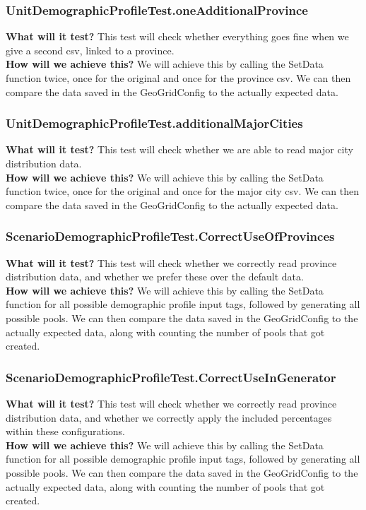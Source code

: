 \documentclass{article}
\begin{document}
\newpage

\subsubsection{UnitDemographicProfileTest.oneAdditionalProvince}
\textbf{What will it test?} 
This test will check whether everything goes fine when we give a second csv, linked to a province. \\
\newline
\textbf{How will we achieve this?}
We will achieve this by calling the SetData function twice, once for the original and once for the province csv. We can then compare the data saved in the GeoGridConfig to the actually expected data.

\subsubsection{UnitDemographicProfileTest.additionalMajorCities}
\textbf{What will it test?} 
This test will check whether we are able to read major city distribution data. \\
\newline
\textbf{How will we achieve this?}
We will achieve this by calling the SetData function twice, once for the original and once for the major city csv. We can then compare the data saved in the GeoGridConfig to the actually expected data.

\subsubsection{ScenarioDemographicProfileTest.CorrectUseOfProvinces}
\textbf{What will it test?} 
This test will check whether we correctly read province distribution data, and whether we prefer these over the default data. \\
\newline
\textbf{How will we achieve this?}
We will achieve this by calling the SetData function for all possible demographic profile input tags, followed by generating all possible pools. We can then compare the data saved in the GeoGridConfig to the actually expected data, along with counting the number of pools that got created.

\subsubsection{ScenarioDemographicProfileTest.CorrectUseInGenerator}
\textbf{What will it test?} 
This test will check whether we correctly read province distribution data, and whether we correctly apply the included percentages within these configurations. \\
\newline
\textbf{How will we achieve this?}
We will achieve this by calling the SetData function for all possible demographic profile input tags, followed by generating all possible pools. We can then compare the data saved in the GeoGridConfig to the actually expected data, along with counting the number of pools that got created.
\end{document}
